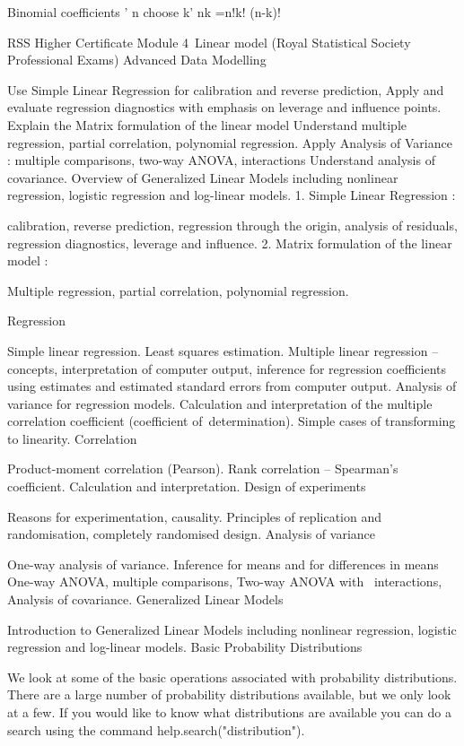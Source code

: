 \documentclass[a4paper,12pt]{article}
\begin{document}
Binomial coefficients
' n choose k'
nk =n!k! (n-k)!

RSS Higher Certificate Module 4 Linear model
(Royal Statistical Society Professional Exams)
Advanced Data Modelling

Use Simple Linear Regression for calibration and reverse prediction,
Apply and evaluate regression diagnostics with emphasis on leverage and influence points.
Explain the Matrix formulation of the linear model
Understand multiple regression, partial correlation, polynomial regression.
Apply Analysis of Variance : multiple comparisons, two-way ANOVA, interactions
Understand analysis of covariance.
Overview of Generalized Linear Models including nonlinear regression, logistic regression and log-linear models.
1. Simple Linear Regression :

calibration, reverse prediction, regression through the origin, analysis of residuals, regression diagnostics, leverage and influence.
2. Matrix formulation of the linear model :

Multiple regression, partial correlation, polynomial regression.

Regression

Simple linear regression. Least squares estimation.
Multiple linear regression – concepts, interpretation of computer output, inference for regression coefficients using estimates and estimated standard errors from computer output.
Analysis of variance for regression models.
Calculation and interpretation of the multiple correlation coefficient (coefficient of determination).
Simple cases of transforming to linearity.
Correlation

Product-moment correlation (Pearson).
Rank correlation – Spearman’s coefficient.
Calculation and interpretation.
Design of experiments

Reasons for experimentation, causality.
Principles of replication and randomisation, completely randomised design.
Analysis of variance

One-way analysis of variance.
Inference for means and for differences in means
One-way ANOVA, multiple comparisons,
Two-way ANOVA with  interactions,
Analysis of covariance.
Generalized Linear Models

Introduction to Generalized Linear Models including nonlinear regression, logistic regression and log-linear models.
Basic Probability Distributions

We look at some of the basic operations associated with probability distributions. There are a large number of probability distributions available, but we only look at a few. If you would like to know what distributions are available you can do a search using the command help.search("distribution").
\end{document}

